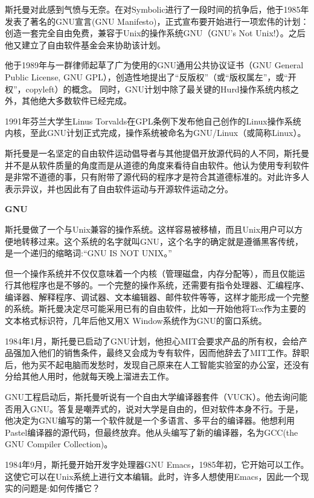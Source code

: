 \documentclass[doctor,openright,twoside]{sjtuthesis}
\theoremstyle{plain}
\theoremstyle{definition}
\theoremstyle{remark}
\theoremstyle{ocrenumbox}
\theoremstyle{plain}
\newcommand\cqh{“}
\newcommand\cqt{”}
\begin{document}
斯托曼对此感到气愤与无奈。在对Symbolic进行了一段时间的抗争后，他于1985年发表了著名的GNU宣言(GNU
Manifesto)，正式宣布要开始进行一项宏伟的计划：创造一套完全自由免费，兼容于Unix的操作系统GNU（GNU's
Not Unix!）。之后他又建立了自由软件基金会来协助该计划。

他于1989年与一群律师起草了广为使用的GNU通用公共协议证书（GNU General
Public License, GNU
GPL），创造性地提出了\cqh 反版权\cqt （或\cqh 版权属左\cqt ，或\cqh 开权\cqt ，copyleft）的概念。
同时，GNU计划中除了最关键的Hurd操作系统内核之外，其他绝大多数软件已经完成。

1991年芬兰大学生Linus
Torvalds在GPL条例下发布他自己创作的Linux操作系统内核，至此GNU计划正式完成，操作系统被命名为GNU/Linux（或简称Linux）。

斯托曼是一名坚定的自由软件运动倡导者与其他提倡开放源代码的人不同，斯托曼并不是从软件质量的角度而是从道德的角度来看待自由软件。他认为使用专利软件是非常不道德的事，只有附带了源代码的程序才是符合其道德标准的。对此许多人表示异议，并也因此有了自由软件运动与开源软件运动之分。

\textbf{GNU}

斯托曼做了一个与Unix兼容的操作系统。这样容易被移植，而且Unix用户可以方便地转移过来。这个系统的名字就叫GNU，这个名字的确定就是遵循黑客传统，是一个递归的缩略词:\cqh GNU
IS NOT UNIX。\cqt 

但一个操作系统并不仅仅意味着一个内核（管理磁盘，内存分配等），而且仅能运行其他程序也是不够的。一个完整的操作系统，还需要有指令处理器、汇编程序、编译器、解释程序、调试器、文本编辑器、邮件软件等等，这样才能形成一个完整的系统。斯托曼决定尽可能采用已有的自由软件，比如一开始他将Tex作为主要的文本格式标识符，几年后他又用X
Window系统作为GNU的窗口系统。

1984年1月，斯托曼已启动了GNU计划，他担心MIT会要求产品的所有权，会给产品强加入他们的销售条件，最终又会成为专有软件，因而他辞去了MIT工作。辞职后，他为买不起电脑而发愁时，发现自己原来在人工智能实验室的办公室，还没有分给其他人用时，他就每天晚上溜进去工作。

GNU工程启动后，斯托曼听说有一个自由大学编译器套件（VUCK）。他去询问能否用入GNU。答复是嘲弄式的，说对大学是自由的，但对软件本身不行。于是，他决定为GNU编写的第一个软件就是一个多语言、多平台的编译器。他想利用Pastel编译器的源代码，但最终放弃。他从头编写了新的编译器，名为GCC(the
GNU Compiler Collection)。

1984年9月，斯托曼开始开发字处理器GNU
Emacs，1985年初，它开始可以工作。这使它可以在Unix系统上进行文本编辑。此时，许多人想使用Emacs，因此一个现实的问题是:如何传播它？
\end{document}
